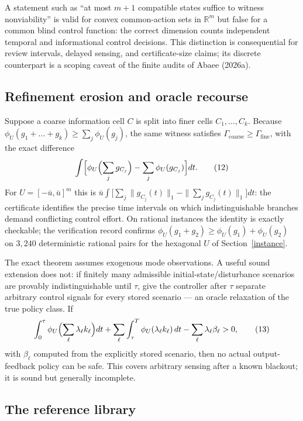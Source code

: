 \documentclass[10pt,twocolumn]{article}
\theoremstyle{plain}
\theoremstyle{definition}
\theoremstyle{remark}
\begin{document}
A statement such as ``at most \(m+1\) compatible states suffice to witness
nonviability'' is valid for convex common-action sets in \(\mathbb{R}^m\) but
false for a common blind control function: the correct dimension counts
independent temporal and informational control decisions. This distinction
is consequential for review intervals, delayed sensing, and
certificate-size claims; its discrete counterpart is a scoping caveat of the
finite audits of Abaee (2026a).

\subsection{Refinement erosion and oracle recourse}\label{erosion}

Suppose a coarse information cell \(C\) is split into finer cells
\(C_1,\dots,C_k\). Because
\(\phi_U(g_1 + \dots + g_k) \ge \sum_j \phi_U(g_j)\), the same witness
satisfies \(\Gamma_{\mathrm{coarse}} \ge \Gamma_{\mathrm{fine}}\), with the
exact difference
\[
\int \Bigl[ \phi_U\Bigl(\sum_j g_{C_j}\Bigr) - \sum_j \phi_U(g_{C_j}) \Bigr]
dt.
\tag{12}
\]
For \(U = [-\bar u, \bar u]^m\) this is
\(\bar u \int \bigl[\sum_j \|g_{C_j}(t)\|_1 - \|\sum_j g_{C_j}(t)\|_1\bigr] dt\):
the certificate identifies the precise time intervals on which
indistinguishable branches demand conflicting control effort. On rational
instances the identity is exactly checkable; the verification record confirms
\(\phi_U(g_1 + g_2) \ge \phi_U(g_1) + \phi_U(g_2)\) on \(3{,}240\)
deterministic rational pairs for the hexagonal \(U\) of
Section~\ref{instance}.

The exact theorem assumes exogenous mode observations. A useful sound
extension does not: if finitely many admissible initial-state/disturbance
scenarios are provably indistinguishable until \(\tau\), give the controller
after \(\tau\) separate arbitrary control signals for every stored scenario
--- an oracle relaxation of the true policy class. If
\[
\int_0^\tau \phi_U\Bigl(\sum_\ell \lambda_\ell k_\ell\Bigr) dt
+ \sum_\ell \int_\tau^T \phi_U(\lambda_\ell k_\ell)\, dt
- \sum_\ell \lambda_\ell \beta_\ell > 0,
\tag{13}
\]
with \(\beta_\ell\) computed from the explicitly stored scenario, then no
actual output-feedback policy can be safe. This covers arbitrary sensing
after a known blackout; it is sound but generally incomplete.

\subsection{The reference library}\label{library}
\end{document}
